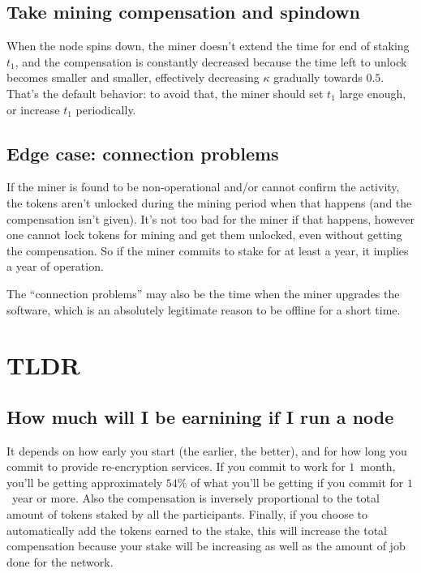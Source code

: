 \documentclass[longbibliography,nofootinbib,twocolumn]{revtex4-1}
\begin{document}
\subsection{Take mining compensation and spindown}

When the node spins down, the miner doesn't extend the time for end of staking $t_1$,
and the compensation is constantly decreased because the time left to unlock becomes smaller and smaller,
effectively decreasing $\kappa$ gradually towards $0.5$.
That's the default behavior: to avoid that, the miner should set $t_1$ large enough, or increase $t_1$ periodically.

\subsection{Edge case: connection problems}

If the miner is found to be non-operational and/or cannot confirm the activity, the tokens aren't unlocked during the mining period when that happens (and the
compensation isn't given).
It's not too bad for the miner if that happens, however one cannot lock tokens for mining and get them unlocked, even without getting the compensation.
So if the miner commits to stake for at least a year, it implies a year of operation.

The ``connection problems'' may also be the time when the miner upgrades the software, which is an absolutely legitimate reason to be offline for a short time.

\section{TLDR}

\subsection{How much will I be earnining if I run a node}
It depends on how early you start (the earlier, the better), and for how long you commit to provide re-encryption services.
If you commit to work for $1$~month, you'll be getting approximately $54\%$ of what you'll be getting if you commit for $1$~year or more.
Also the compensation is inversely proportional to the total amount of tokens staked by all the participants.
Finally, if you choose to automatically add the tokens earned to the stake, this will increase the total compensation because your stake will be increasing as
well as the amount of job done for the network.
\end{document}
